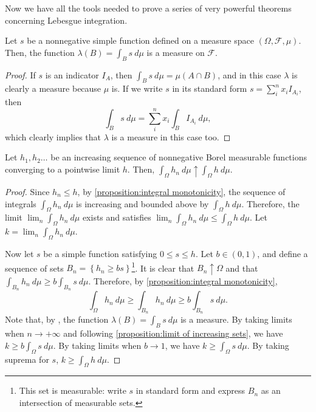 Now we have all the tools needed to prove a series of very powerful theorems
concerning Lebesgue integration.
\begin{lemm}\label{lemma:integral of simple function defines a measure} Let
\(s\) be a nonnegative simple function defined on a measure space
\(\left(\Omega,\mathcal{F},\mu\right)\). Then, the function
\(\lambda(B)=\int_{B}s ~d\mu\) is a measure on \(\mathcal{F}\).
\end{lemm}
\begin{proof} If \(s\) is an indicator \(I_{A}\), then
\(\int_{B}s~d\mu=\mu(A\cap B)\), and in this case \(\lambda\) is clearly a
measure because \(\mu\) is.  If we write \(s\) in its standard form
\(s=\sum_{i}^{n}x_{i}I_{A_{i}}\), then
	\[ \int_{B}s~d\mu=\sum_{i}^{n}x_{i}\int_{B}I_{A_{i}}~d\mu,
	\] which clearly implies that \(\lambda\) is a measure in this case too.
\end{proof}
\begin{thrm}\label{theorem:Monotone
Convergence}
	
	Let \(h_1,h_2\dots\) be an increasing sequence of nonnegative Borel
measurable functions converging to a pointwise limit \(h\). Then,
\(\int_{\Omega}h_n~d\mu\uparrow\int_{\Omega}h~d\mu\).
\end{thrm}
\begin{proof}
	Since \(h_n\leq h\), by \cref{proposition:integral monotonicity}, the
sequence of integrals \(\int_{\Omega}h_n~d\mu\) is increasing and bounded above
by \(\int_{\Omega}h~d\mu\). Therefore, the limit \(\lim_n\int_{\Omega}h_n~d\mu\)
exists and satisfies \(\lim_n\int_{\Omega}h_n~d\mu\leq\int_{\Omega}h~d\mu.\) Let
\(k=\lim_n\int_{\Omega}h_n~d\mu\).
	
	Now let \(s\) be a simple function satisfying \(0\leq s\leq h\). Let
\(b\in(0,1)\), and define a sequence of sets
\(B_n=\left\{h_n\geq bs\right\}\)\footnote{This set is measurable: write \(s\) in standard form and express \(B_n\) as an intersection of measurable sets.}. It is clear that
\(B_n\uparrow\Omega\) and that \(\int_{B_n}h_n~d\mu\geq b\int_{B_n}s~d\mu\).
Therefore, by \cref{proposition:integral monotonicity},
	\[\int_{\Omega}h_n~d\mu\geq\int_{B_n}h_n~d\mu\geq b\int_{B_n}s~d\mu.\] Note
that, by , the
function \(\lambda(B)=\int_{B}s~d\mu\) is a measure. By taking limits when
\(n\to+\infty\) and following \cref{proposition:limit of increasing sets}, we
have \(k\geq b\int_{\Omega}s~d\mu\). By taking limits when \(b\to1\), we have
\(k\geq\int_{\Omega}s~d\mu\). By taking suprema for \(s\),
\(k\geq\int_{\Omega}h~d\mu\).
\end{proof}
